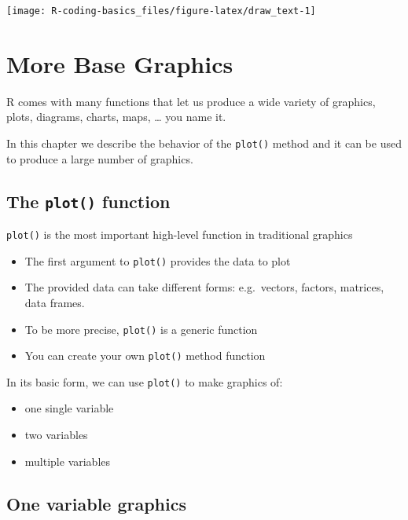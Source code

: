 \documentclass[
]{book}
\begin{document}
\begin{center}\texttt{[image: R-coding-basics\_files/figure-latex/draw\_text-1]} \end{center}

\hypertarget{graphics2}{%
\chapter{More Base Graphics}\label{graphics2}}

R comes with many functions that let us produce a wide variety of graphics,
plots, diagrams, charts, maps, \ldots{} you name it.

In this chapter we describe the behavior of the \texttt{plot()} method and it
can be used to produce a large number of graphics.

\hypertarget{the-plot-function-1}{%
\section{\texorpdfstring{The \texttt{plot()} function}{The plot() function}}\label{the-plot-function-1}}

\texttt{plot()} is the most important high-level function in traditional graphics

\begin{itemize}
\item
  The first argument to \texttt{plot()} provides the data to plot
\item
  The provided data can take different forms: e.g.~vectors, factors, matrices,
  data frames.
\item
  To be more precise, \texttt{plot()} is a generic function
\item
  You can create your own \texttt{plot()} method function
\end{itemize}

In its basic form, we can use \texttt{plot()} to make graphics of:

\begin{itemize}
\item
  one single variable
\item
  two variables
\item
  multiple variables
\end{itemize}

\hypertarget{one-variable-graphics}{%
\section{One variable graphics}\label{one-variable-graphics}}
\end{document}
